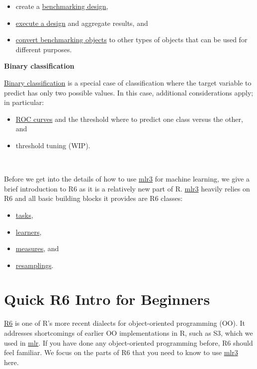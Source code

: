 \documentclass[
]{scrbook}
\providecommand{\tightlist}{%
  \setlength{\itemsep}{0pt}\setlength{\parskip}{0pt}}
\begin{document}
\begin{itemize}
\tightlist
\item
  create a \protect\hyperlink{bm-design}{benchmarking design},
\item
  \protect\hyperlink{bm-exec}{execute a design} and aggregate results, and
\item
  \protect\hyperlink{bm-resamp}{convert benchmarking objects} to other types of objects that can be used for different purposes.
\end{itemize}

\textbf{Binary classification}

\protect\hyperlink{binary-classification}{Binary classification} is a special case of classification where the target variable to predict has only two possible values.
In this case, additional considerations apply; in particular:

\begin{itemize}
\tightlist
\item
  \protect\hyperlink{binary-roc}{ROC curves} and the threshold where to predict one class versus the other, and
\item
  threshold tuning (WIP).
\end{itemize}

\(~~~~~~~~~~~\)

Before we get into the details of how to use \href{https://mlr3.mlr-org.com}{mlr3} for machine learning, we give a brief introduction to R6 as it is a relatively new part of R.
\href{https://mlr3.mlr-org.com}{mlr3} heavily relies on R6 and all basic building blocks it provides are R6 classes:

\begin{itemize}
\tightlist
\item
  \protect\hyperlink{tasks}{tasks},
\item
  \protect\hyperlink{learners}{learners},
\item
  \protect\hyperlink{list-measures}{measures}, and
\item
  \protect\hyperlink{resampling}{resamplings}.
\end{itemize}

\hypertarget{r6}{%
\section{Quick R6 Intro for Beginners}\label{r6}}

\href{https://cran.r-project.org/package=R6}{R6} is one of R's more recent dialects for object-oriented programming (OO).
It addresses shortcomings of earlier OO implementations in R, such as S3, which we used in \href{https://mlr.mlr-org.com}{mlr}.
If you have done any object-oriented programming before, R6 should feel familiar.
We focus on the parts of R6 that you need to know to use \href{https://mlr3.mlr-org.com}{mlr3} here.
\end{document}
